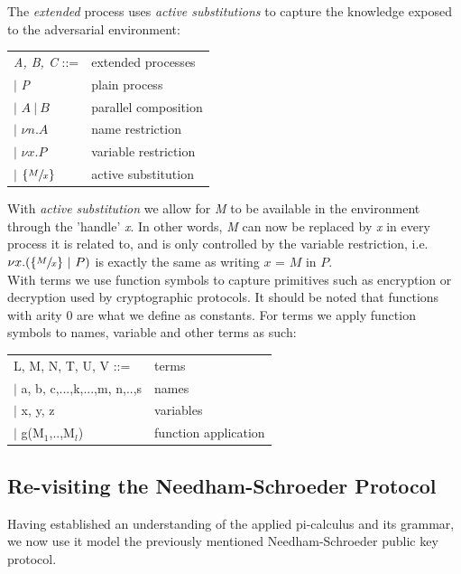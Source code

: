 \noindent The \textit{extended} process uses \textit{active substitutions} to capture the knowledge exposed to the
adversarial environment: 
\begin{center}
	\begin{tabular} { l l }
 		\textit{A, B, C} ::= & extended processes \\ 
 		\quad $|$ \textit{P} & plain process \\  
 		\quad $|$ $A\ |\ B$ & parallel composition \\
		\quad $|$ $\nu n.A$ & name restriction \\
		\quad $|$ $\nu x.P$ & variable restriction \\
		\quad $|$ $\{ \sfrac{M}{x} \}$ & active substitution
	\end{tabular}
\end{center}
With \textit{active substitution} we allow for \textit{M} to be available in the environment through the 'handle' \textit{x}. In other words, \textit{M} can now be replaced by \textit{x} in every process it is related to, and is only controlled by the variable restriction, i.e. $\nu x.(\{\sfrac{M}{x}\}\ |\ P)$ is exactly the same as writing $x$ = $M$ in $P.$\\ 

With terms we use function symbols to capture primitives such as encryption or decryption used by cryptographic protocols. It should be noted that functions with arity 0 are what we define as constants.
For terms we apply function symbols to names, variable and other terms as such: 
\begin{center}
	\begin{tabular} { l l }
 		L, M, N, T, U, V ::= & terms \\ 
 		\quad $|$ a, b, c,...,k,...,m, n,..,s & names \\  
 		\quad $|$ x, y, z & variables \\
 		\quad $|$ g(M$_{1}$,..,M$_{l}$) & function application
	\end{tabular}
\end{center}

\subsection{Re-visiting the Needham-Schroeder Protocol}
Having established an understanding of the applied pi-calculus and its grammar, we now use it model the previously mentioned Needham-Schroeder public key protocol.\\

